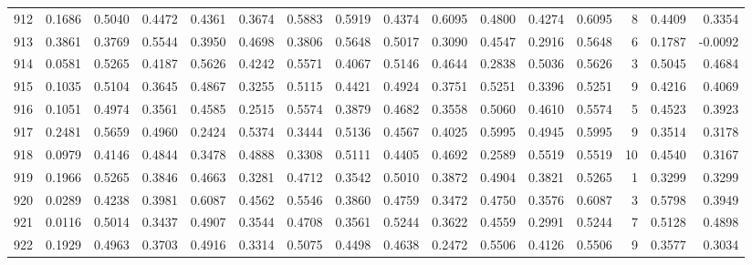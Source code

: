 \begin{tabular}{lrrrrrrrrrrrrrrr}
912 &      0.1686 &  0.5040 &  0.4472 &  0.4361 &  0.3674 &  0.5883 &  0.5919 &  0.4374 &  0.6095 &  0.4800 &   0.4274 &     0.6095 &      8 &                    0.4409 &                     0.3354 \\
913 &      0.3861 &  0.3769 &  0.5544 &  0.3950 &  0.4698 &  0.3806 &  0.5648 &  0.5017 &  0.3090 &  0.4547 &   0.2916 &     0.5648 &      6 &                    0.1787 &                    -0.0092 \\
914 &      0.0581 &  0.5265 &  0.4187 &  0.5626 &  0.4242 &  0.5571 &  0.4067 &  0.5146 &  0.4644 &  0.2838 &   0.5036 &     0.5626 &      3 &                    0.5045 &                     0.4684 \\
915 &      0.1035 &  0.5104 &  0.3645 &  0.4867 &  0.3255 &  0.5115 &  0.4421 &  0.4924 &  0.3751 &  0.5251 &   0.3396 &     0.5251 &      9 &                    0.4216 &                     0.4069 \\
916 &      0.1051 &  0.4974 &  0.3561 &  0.4585 &  0.2515 &  0.5574 &  0.3879 &  0.4682 &  0.3558 &  0.5060 &   0.4610 &     0.5574 &      5 &                    0.4523 &                     0.3923 \\
917 &      0.2481 &  0.5659 &  0.4960 &  0.2424 &  0.5374 &  0.3444 &  0.5136 &  0.4567 &  0.4025 &  0.5995 &   0.4945 &     0.5995 &      9 &                    0.3514 &                     0.3178 \\
918 &      0.0979 &  0.4146 &  0.4844 &  0.3478 &  0.4888 &  0.3308 &  0.5111 &  0.4405 &  0.4692 &  0.2589 &   0.5519 &     0.5519 &     10 &                    0.4540 &                     0.3167 \\
919 &      0.1966 &  0.5265 &  0.3846 &  0.4663 &  0.3281 &  0.4712 &  0.3542 &  0.5010 &  0.3872 &  0.4904 &   0.3821 &     0.5265 &      1 &                    0.3299 &                     0.3299 \\
920 &      0.0289 &  0.4238 &  0.3981 &  0.6087 &  0.4562 &  0.5546 &  0.3860 &  0.4759 &  0.3472 &  0.4750 &   0.3576 &     0.6087 &      3 &                    0.5798 &                     0.3949 \\
921 &      0.0116 &  0.5014 &  0.3437 &  0.4907 &  0.3544 &  0.4708 &  0.3561 &  0.5244 &  0.3622 &  0.4559 &   0.2991 &     0.5244 &      7 &                    0.5128 &                     0.4898 \\
922 &      0.1929 &  0.4963 &  0.3703 &  0.4916 &  0.3314 &  0.5075 &  0.4498 &  0.4638 &  0.2472 &  0.5506 &   0.4126 &     0.5506 &      9 &                    0.3577 &                     0.3034 \\

\end{tabular}
